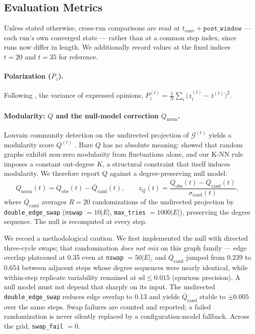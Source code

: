 \subsection{Evaluation Metrics}
\label{sec:metrics}

Unless stated otherwise, cross-run comparisons are read at
$t_{\mathrm{conv}} + \texttt{post\_window}$ --- each run's own converged state --- rather
than at a common step index, since runs now differ in length. We additionally record
values at the fixed indices $t = 20$ and $t = 35$ for reference.

\paragraph{Polarization ($P_z$).}
Following \citet{chitra2020filter}, the variance of expressed opinions,
$P_z^{(t)} = \frac{1}{N}\sum_i \bigl(z_i^{(t)} - \bar{z}^{(t)}\bigr)^2$.

\paragraph{Modularity: $Q$ and the null-model correction $Q_{\mathrm{norm}}$.}
Louvain community detection \citep{blondel2008fast} on the undirected projection of
$\mathcal{G}^{(t)}$ yields a modularity score $Q^{(t)}$ \citep{newman2004finding}.
Bare $Q$ has no absolute meaning: \citet{guimera2004modularity} showed that random
graphs exhibit non-zero modularity from fluctuations alone, and our K-NN rule imposes a
constant out-degree $K$, a structural constraint that itself induces modularity. We
therefore report $Q$ against a degree-preserving null model:
\[
Q_{\mathrm{norm}}(t) = Q_{\mathrm{obs}}(t) - \bar{Q}_{\mathrm{rand}}(t),
\qquad
z_Q(t) = \frac{Q_{\mathrm{obs}}(t) - \bar{Q}_{\mathrm{rand}}(t)}{\sigma_{\mathrm{rand}}(t)},
\]
where $\bar{Q}_{\mathrm{rand}}$ averages $R = 20$ randomizations of the undirected
projection by \texttt{double\_edge\_swap} (\texttt{nswap} $= 10|E|$,
\texttt{max\_tries} $= 1000|E|$), preserving the degree sequence. The null is recomputed
at every step.

We record a methodological caution. We first implemented the null with directed
three-cycle swaps; that randomization \emph{does not mix} on this graph family --- edge
overlap plateaued at 0.35 even at \texttt{nswap} $= 50|E|$, and $\bar{Q}_{\mathrm{rand}}$
jumped from 0.239 to 0.654 between adjacent steps whose degree sequences were nearly
identical, while within-step replicate variability remained at $\mathrm{sd} \le 0.015$
(spurious precision). A null model must not depend that sharply on its input. The
undirected \texttt{double\_edge\_swap} reduces edge overlap to 0.13 and yields
$\bar{Q}_{\mathrm{rand}}$ stable to $\pm 0.005$ over the same steps. Swap failures are
counted and reported; a failed randomization is never silently replaced by a
configuration-model fallback. Across the grid, \texttt{swap\_fail} $= 0$.

